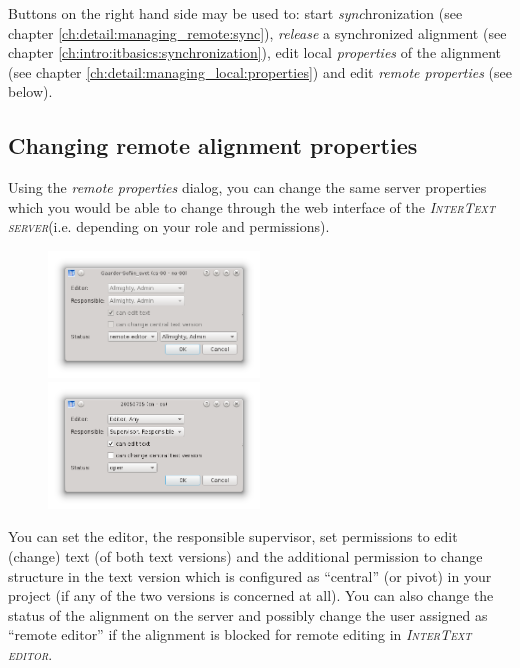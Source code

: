 \documentclass[a4paper,10pt,oneside]{book}
\newcommand{\ITeditor}{\textit{\textsc{InterText editor}}\xspace}
\newcommand{\ITserver}{\textit{\textsc{InterText server}}\xspace}
\begin{document}
Buttons on the right hand side may be used to: start \emph{sync}hronization (see chapter \ref{ch:detail:managing_remote:sync}), \emph{release} a synchronized alignment (see chapter \ref{ch:intro:itbasics:synchronization}), edit local \emph{properties} of the alignment (see chapter \ref{ch:detail:managing_local:properties}) and edit \emph{remote properties} (see below).

\subsection{Changing remote alignment properties}\label{ch:detail:managing_remote:remote_properties}

Using the \emph{remote properties} dialog, you can change the same server properties which you would be able to change through the web interface of the \ITserver (i.e. depending on your role and permissions).

\begin{figure}[htb]
 \includegraphics[width=0.5\textwidth]{screenshots/remote_props1.png}
 \includegraphics[width=0.5\textwidth]{screenshots/remote_props2.png}
\end{figure}

You can set the editor, the responsible supervisor, set permissions to edit (change) text (of both text versions) and the additional permission to change structure in the text version which is configured as ``central'' (or pivot) in your project (if any of the two versions is concerned at all). You can also change the status of the alignment on the server and possibly change the user assigned as ``remote editor'' if the alignment is blocked for remote editing in \ITeditor.
\end{document}
